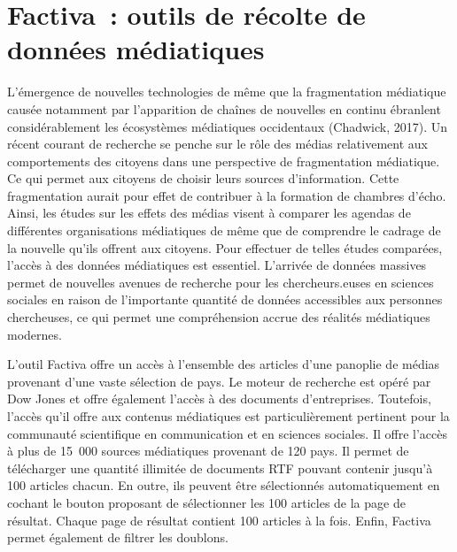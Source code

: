 \documentclass[
  letterpaper,
]{scrbook}
\begin{document}
\hypertarget{factiva-outils-de-ruxe9colte-de-donnuxe9es-muxe9diatiques}{%
\section{\texorpdfstring{\textbf{Factiva~: outils de récolte de données
médiatiques}}{Factiva~: outils de récolte de données médiatiques}}\label{factiva-outils-de-ruxe9colte-de-donnuxe9es-muxe9diatiques}}

L'émergence de nouvelles technologies de même que la fragmentation
médiatique causée notamment par l'apparition de chaînes de nouvelles en
continu ébranlent considérablement les écosystèmes médiatiques
occidentaux (Chadwick, 2017). Un récent courant de recherche se penche
sur le rôle des médias relativement aux comportements des citoyens dans
une perspective de fragmentation médiatique. Ce qui permet aux citoyens
de choisir leurs sources d'information. Cette fragmentation aurait pour
effet de contribuer à la formation de chambres d'écho. Ainsi, les études
sur les effets des médias visent à comparer les agendas de différentes
organisations médiatiques de même que de comprendre le cadrage de la
nouvelle qu'ils offrent aux citoyens. Pour effectuer de telles études
comparées, l'accès à des données médiatiques est essentiel. L'arrivée de
données massives permet de nouvelles avenues de recherche pour les
chercheurs.euses en sciences sociales en raison de l'importante quantité
de données accessibles aux personnes chercheuses, ce qui permet une
compréhension accrue des réalités médiatiques modernes.

L'outil Factiva offre un accès à l'ensemble des articles d'une panoplie
de médias provenant d'une vaste sélection de pays. Le moteur de
recherche est opéré par Dow Jones et offre également l'accès à des
documents d'entreprises. Toutefois, l'accès qu'il offre aux contenus
médiatiques est particulièrement pertinent pour la communauté
scientifique en communication et en sciences sociales. Il offre l'accès
à plus de 15~000 sources médiatiques provenant de 120 pays. Il permet de
télécharger une quantité illimitée de documents RTF pouvant contenir
jusqu'à 100 articles chacun. En outre, ils peuvent être sélectionnés
automatiquement en cochant le bouton proposant de sélectionner les 100
articles de la page de résultat. Chaque page de résultat contient 100
articles à la fois. Enfin, Factiva permet également de filtrer les
doublons.
\end{document}
